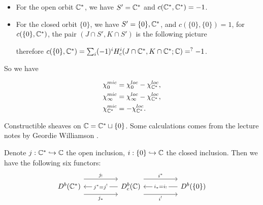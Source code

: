 \begin{itemize}
  \item For the open orbit $\mathbb{C}^*$, we have $S' = \mathbb{C}^*$ and $c(\mathbb{C}^*,\mathbb{C}^*) = -1$.
  \item For the closed orbit $\{0\}$, we have $S' = \{0\}, \mathbb{C}^*$, and $c(\{0\},\{0\}) = 1$, for $c(\{0\},\mathbb{C}^*)$, the pair $(J \cap S', K \cap S')$ is the following picture

\begin{center}
\end{center}
therefore $c(\{0\},\mathbb{C}^*) = \sum_i (-1)^i H^i_c(J \cap \mathbb{C}^*, K \cap \mathbb{C}^*; \mathbb{C}) =^{?} -1$.
\end{itemize}


So we have

\begin{align*}
  \chi^{mic}_{0} &= \chi^{loc}_{0} - \chi^{loc}_{\mathbb{C}^*}, \\
  \chi^{mic}_{\infty} &= \chi^{loc}_{\infty} - \chi^{loc}_{\mathbb{C}^*}, \\
  \chi^{mic}_{\mathbb{C}^*} &= -\chi^{loc}_{\mathbb{C}^*}.
\end{align*}




Constructible sheaves on $\mathbb{C} = \mathbb{C}^* \sqcup \{0\}$. Some calculations comes from the lecture notes by Geordie Williamson \cite{Wil15}.

Denote $j: \mathbb{C}^* \hookrightarrow \mathbb{C}$ the open inclusion, $i: \{0\} \hookrightarrow \mathbb{C}$ the closed inclusion. Then we have the following six functors:
\[
\begin{tikzcd}[column sep=huge]
  D^b(\mathbb{C}^*)
  \arrow[r, shift left=2.5ex, "j_!"]
  \arrow[r, shift right=2.5ex, "j_*"']
  & D^b_c(\mathbb{C})
  \arrow[r, shift left=2.5ex, "i^*"]
  \arrow[r, shift right=2.5ex, "i^!"']
  \arrow[l, "j^{*} = j^!" description]
  & D^b(\{0\})
  \arrow[l, "i_* = i_!" description]
\end{tikzcd}
\]

